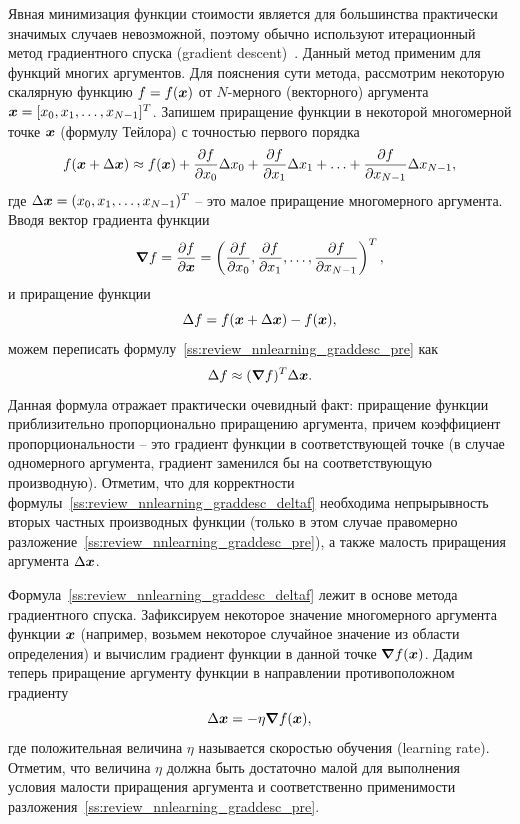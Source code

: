 \documentclass[a4paper,12pt,russian]{article} %
\begin{document}
Явная минимизация функции стоимости является для большинства практически значимых случаев невозможной, поэтому обычно используют итерационный метод градиентного спуска (gradient descent)~\cite{fletcher1963rapidly}.
Данный метод применим для функций многих аргументов.
Для пояснения сути метода, рассмотрим некоторую скалярную функцию $f = f(\bm{x})$ от $N$-мерного (векторного) аргумента $\bm{x} = [x_0, x_1, \ldots, x_{N-1}]^T$.
Запишем приращение функции в некоторой многомерной точке $\bm{x}$ (формулу Тейлора) с точностью первого порядка
\begin{equation} \label{ss:review_nnlearning_graddesc_pre}
	f(\bm{x} + \Delta \bm{x}) \approx
		f(\bm{x}) + \frac{\partial f}{\partial x_0} \Delta x_0 + 
		\frac{\partial f}{\partial x_1} \Delta x_1 + 
		\ldots + 
		\frac{\partial f}{\partial x_{N-1}} \Delta x_{N-1},
\end{equation}
где $\Delta \bm{x} = (x_0, x_1, \ldots, x_{N-1})^T$ -- это малое приращение многомерного аргумента.
Вводя вектор градиента функции
$$
	\bm{\nabla} f = 
		\frac{\partial f}{\partial \bm{x}} =
		\left( \frac{\partial f}{\partial x_0}, \frac{\partial f}{\partial x_1}, \ldots , \frac{\partial f}{\partial x_{N-1}}  \right)^T,
$$
и приращение функции
$$
	\Delta f = f(\bm{x} + \Delta \bm{x}) - f(\bm{x}),
$$
можем переписать формулу~\eqref{ss:review_nnlearning_graddesc_pre} как
\begin{equation} \label{ss:review_nnlearning_graddesc_deltaf}
	\Delta f  \approx ( \bm{\nabla} f )^T \Delta \bm{x}.
\end{equation}
Данная формула отражает практически очевидный факт: приращение функции приблизительно пропорционально приращению аргумента, причем коэффициент пропорциональности -- это градиент функции в соответствующей точке (в случае одномерного аргумента, градиент заменился бы на соответствующую производную).
Отметим, что для корректности формулы~\eqref{ss:review_nnlearning_graddesc_deltaf} необходима непрырывность вторых частных производных функции (только в этом случае правомерно разложение~\eqref{ss:review_nnlearning_graddesc_pre}), а также малость приращения аргумента $\Delta \bm{x}$.

Формула~\eqref{ss:review_nnlearning_graddesc_deltaf} лежит в основе метода градиентного спуска.
Зафиксируем некоторое значение многомерного аргумента функции $\bm{x}$ (например, возьмем некоторое случайное значение из области определения) и вычислим градиент функции в данной точке $\bm{\nabla} f (\bm{x})$.
Дадим теперь приращение аргументу функции в направлении противоположном градиенту
\begin{equation} \label{ss:review_nnlearning_graddesc_deltax}
	\Delta \bm{x} = - \eta \bm{\nabla} f (\bm{x}),
\end{equation}
где положительная величина $\eta$ называется скоростью обучения (learning rate).
Отметим, что величина $\eta$ должна быть достаточно малой для выполнения условия малости приращения аргумента и соответственно применимости разложения~\eqref{ss:review_nnlearning_graddesc_pre}.
\end{document}
